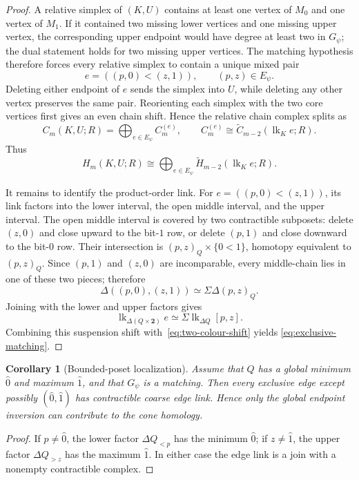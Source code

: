 \documentclass[11pt]{article}
\newtheorem{corollary}[theorem]{Corollary}
\begin{document}
\begin{proof}
A relative simplex of $(K,U)$ contains at least one vertex of $M_0$ and one
vertex of $M_1$.  If it contained two missing lower vertices and one missing
upper vertex, the corresponding upper endpoint would have degree at least two
in $G_\psi$; the dual statement holds for two missing upper vertices.  The
matching hypothesis therefore forces every relative simplex to contain a unique
mixed pair
\[
e=((p,0)<(z,1)),\qquad (p,z)\in E_\psi.
\]
Deleting either endpoint of $e$ sends the simplex into $U$, while deleting any
other vertex preserves the same pair.  Reorienting each simplex with the two core vertices first gives an even
chain shift.  Hence the relative chain complex splits
as
\[
C_m(K,U;R)=\bigoplus_{e\in E_\psi}C_m^{(e)},
\qquad
C_m^{(e)}\cong
\widetilde C_{m-2}(\operatorname{lk}_K e;R).
\]
Thus
\[
H_m(K,U;R)\cong
\bigoplus_{e\in E_\psi}
\widetilde H_{m-2}(\operatorname{lk}_K e;R).
\]

It remains to identify the product-order link.  For
$e=((p,0)<(z,1))$, its link factors into the lower interval, the open middle
interval, and the upper interval.  The open middle interval is covered by two
contractible subposets: delete $(z,0)$ and close upward to the bit-$1$ row, or
delete $(p,1)$ and close downward to the bit-$0$ row.  Their intersection is
$(p,z)_Q\times\{0<1\}$, homotopy equivalent to $(p,z)_Q$.  Since $(p,1)$ and
$(z,0)$ are incomparable, every middle-chain lies in one of these two pieces;
therefore
\[
\Delta((p,0),(z,1))\simeq\Sigma\Delta(p,z)_Q.
\]
Joining with the lower and upper factors gives
\[
\operatorname{lk}_{\Delta(Q\times\mathbf2)}e
\simeq
\Sigma\operatorname{lk}_{\Delta Q}[p,z].
\]
Combining this suspension shift with~\eqref{eq:two-colour-shift} yields
\eqref{eq:exclusive-matching}.
\end{proof}

\begin{corollary}[Bounded-poset localization]
\label{cor:bounded-localization}
Assume that $Q$ has a global minimum $\hat0$ and maximum $\hat1$, and that
$G_\psi$ is a matching.  Then every exclusive edge except possibly
$(\hat0,\hat1)$ has contractible coarse edge link.  Hence only the global
endpoint inversion can contribute to the cone homology.
\end{corollary}

\begin{proof}
If $p\ne\hat0$, the lower factor $\Delta Q_{<p}$ has the minimum $\hat0$; if
$z\ne\hat1$, the upper factor $\Delta Q_{>z}$ has the maximum $\hat1$.  In
either case the edge link is a join with a nonempty contractible complex.
\end{proof}
\end{document}
